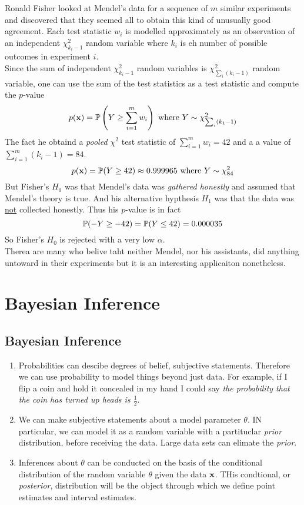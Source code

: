 \documentclass[11pt,a4paper]{article}
\begin{document}
Ronald Fisher looked at Mendel's data for a sequence of $m$ similar experiments and discovered that they seemed all to obtain this kind of unusually good agreement. Each test statistic $w_i$ is modelled approximately as an observation of an independent $\chi^2_{k_i-1}$ random variable where $k_i$ is eh number of possible outcomes in experiment $i$.\\
Since the sum of independent $\chi^2_{k_i-1}$ random variables is $\chi^2_{\sum_i(k_i-1)}$ random variable, one can use the sum of the test statistics as a test statistic and compute the $p$-value
$$p(\textbf{x})=\mathbb{P}\left(Y\geq\sum_{i=1}^mw_i\right)\text{ where }Y\sim\chi^2_{\sum_i(k_1-1)}$$
The fact he obtaind a \textit{pooled $\chi^2$} test statistic of $\sum_{i=1}^mw_i=42$ and a a value of $\sum_{i=1}^m(k_i-1)=84$.\\
$$p(\textbf{x})=\mathbb{P}(Y\geq42)\approx0.999965\text{ where }Y\sim\chi^2_{84}$$
But Fisher's $H_0$ was that Mendel's data was \textit{gathered honestly} and assumed that Mendel's theory is true. And his alternative hypthesis $H_1$ was that the data was \underline{not} collected honestly. Thus his $p$-value is in fact
$$\mathbb{P}(-Y\geq-42)=\mathbb{P}(Y\leq42)=0.000035$$
So Fisher's $H_0$ is rejected with a very low $\alpha$.\\
Therea are many who belive taht neither Mendel, nor his assistants, did anything untoward in their experiments but it is an interesting applicaiton nonetheless.

\section{Bayesian Inference}

\subsection{Bayesian Inference}

\begin{enumerate}
	\item Probabilities can descibe degrees of belief, \ie subjective statements. Therefore we can use probability to model things beyond just data. For example, if I flip a coin and hold it concealed in my hand I could say \textit{the probability that the coin has turned up heads is $\frac{1}{2}$}.
	\item We can make subjective statements about a model parameter $\theta$. IN particular, we can model it as a random variable with a partituclar \textit{prior} distribution, before receiving the data. Large data sets can elimate the \textit{prior}.
	\item Inferences about $\theta$ can be conducted on the basis of the conditional distribution of the random variable $\theta$ given the data $\textbf{x}$. THis condtional, or \textit{posterior}, distribution will be the object through which we define point estimates and interval estimates.
\end{enumerate}
\end{document}
